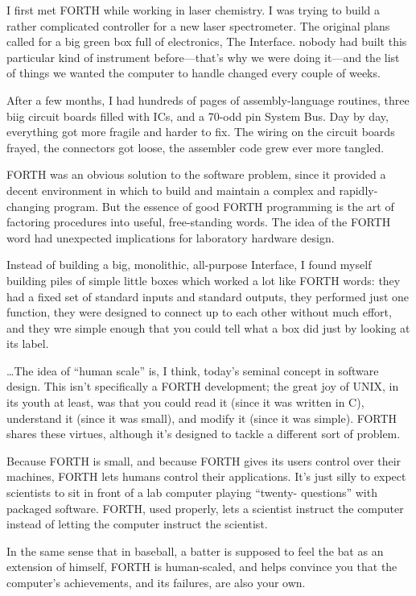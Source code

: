 \begin{tfquot}
I first met FORTH while working in laser chemistry.  I was trying to build a
rather complicated controller for a new laser spectrometer.  The original
plans called for a big green box full of electronics, The Interface.  nobody 
had built this particular kind of instrument before---that's why we were 
doing it---and the list of things we wanted the computer to handle changed
every couple of weeks.

After a few months, I had hundreds of pages of assembly-language 
routines, three biig circuit boards filled with ICs, and a 70-odd pin System
Bus.  Day by day, everything got more fragile and harder to fix.  The wiring 
on the circuit boards frayed, the connectors got loose, the assembler code
grew ever more tangled.

FORTH was an obvious solution to the software problem, since it provided
a decent environment in which to build and maintain a complex and rapidly-
changing program.  But the essence of good FORTH programming is the 
art of factoring procedures into useful, free-standing words.  The idea of the
FORTH word had unexpected implications for laboratory hardware design.

Instead of building a big, monolithic, all-purpose Interface, I found myself
building piles of simple little boxes which worked a lot like FORTH words:
they had a fixed set of standard inputs and standard outputs, they performed
just one function, they were designed to connect up to each other 
without much effort, and they wre simple enough that you could tell what 
a box did just by looking at its label.

\ldots The idea of ``human scale'' is, I think, today's seminal concept in 
software design.  This isn't specifically a FORTH development; the great joy of
UNIX, in its youth at least, was that you could read it (since it was written
in C), understand it (since it was small), and modify it (since it was simple).
FORTH shares these virtues, although it's designed to tackle a different 
sort of problem.

Because FORTH is small, and because FORTH gives its users control over
their machines, FORTH lets humans control their applications.  It's just
silly to expect scientists to sit in front of a lab computer playing ``twenty-
questions'' with packaged software.  FORTH, used properly, lets a scientist
instruct the computer instead of letting the computer instruct the scientist.

In the same sense that in baseball, a batter is supposed to feel the bat as an 
extension of himself, FORTH is human-scaled, and helps convince you that
the computer's achievements, and its failures, are also your own.
\end{tfquot}
